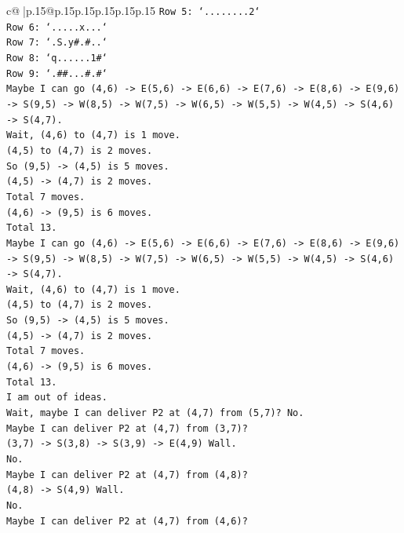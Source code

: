 \documentclass{article}
\begin{document}
{\begin{supertabular}{c@{$\;$}|p{.15\linewidth}@{}p{.15\linewidth}p{.15\linewidth}p{.15\linewidth}p{.15\linewidth}p{.15\linewidth}}
{{{\texttt{Row 5: `........2`} \\
\texttt{Row 6: `.....x...`} \\
\texttt{Row 7: `.S.y\#.\#..`} \\
\texttt{Row 8: `q......1\#`} \\
\texttt{Row 9: `.\#\#...\#.\#`} \\
\texttt{Maybe I can go (4,6) {-}> E(5,6) {-}> E(6,6) {-}> E(7,6) {-}> E(8,6) {-}> E(9,6) {-}> S(9,5) {-}> W(8,5) {-}> W(7,5) {-}> W(6,5) {-}> W(5,5) {-}> W(4,5) {-}> S(4,6) {-}> S(4,7).} \\
\texttt{Wait, (4,6) to (4,7) is 1 move.} \\
\texttt{(4,5) to (4,7) is 2 moves.} \\
\texttt{So (9,5) {-}> (4,5) is 5 moves.} \\
\texttt{(4,5) {-}> (4,7) is 2 moves.} \\
\texttt{Total 7 moves.} \\
\texttt{(4,6) {-}> (9,5) is 6 moves.} \\
\texttt{Total 13.} \\
\texttt{Maybe I can go (4,6) {-}> E(5,6) {-}> E(6,6) {-}> E(7,6) {-}> E(8,6) {-}> E(9,6) {-}> S(9,5) {-}> W(8,5) {-}> W(7,5) {-}> W(6,5) {-}> W(5,5) {-}> W(4,5) {-}> S(4,6) {-}> S(4,7).} \\
\texttt{Wait, (4,6) to (4,7) is 1 move.} \\
\texttt{(4,5) to (4,7) is 2 moves.} \\
\texttt{So (9,5) {-}> (4,5) is 5 moves.} \\
\texttt{(4,5) {-}> (4,7) is 2 moves.} \\
\texttt{Total 7 moves.} \\
\texttt{(4,6) {-}> (9,5) is 6 moves.} \\
\texttt{Total 13.} \\
\texttt{I am out of ideas.} \\
\texttt{Wait, maybe I can deliver P2 at (4,7) from (5,7)? No.} \\
\texttt{Maybe I can deliver P2 at (4,7) from (3,7)?} \\
\texttt{(3,7) {-}> S(3,8) {-}> S(3,9) {-}> E(4,9) Wall.} \\
\texttt{No.} \\
\texttt{Maybe I can deliver P2 at (4,7) from (4,8)?} \\
\texttt{(4,8) {-}> S(4,9) Wall.} \\
\texttt{No.} \\
\texttt{Maybe I can deliver P2 at (4,7) from (4,6)?} \\
}}}
\end{supertabular}}
\end{document}
